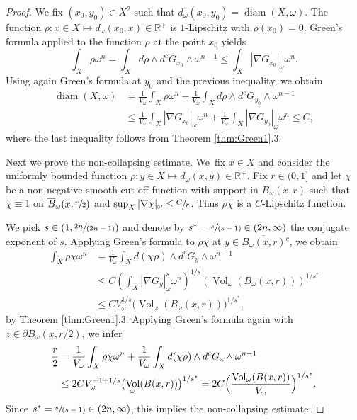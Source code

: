 \documentclass[JEP,XML,SOM,Unicode,published]{cedram}
\newcommand{\spfrac}[2]{\sfrac{#1}{(#2)}}
\DeclareMathOperator{\diam}{diam}
\DeclareMathOperator{\Vol}{Vol}
\theoremstyle{definition}
\begin{document}
\begin{proof}
We fix $(x_0,y_0)\in X^2$ such that $d_\omega(x_0,y_0)=\diam(X, \omega)$.
The function $\rho: x \in X \mapsto d_\omega(x_0, x) \in \mathbb{R}^+$ is $1$-Lipschitz
with $\rho(x_0)=0$. Green's formula applied to the function $\rho$ at the point $x_0$ yields
\[
\int_X \rho \omega^n =\int_X d \rho \wedge d^c G_{x_0} \wedge\omega^{n-1} \leq \int_X |\nabla G_{x_0}|_{\omega}\omega^n .
\]
Using again Green's formula at $y_0$ and the previous inequality, we obtain
\begin{align*}
\diam(X, \omega)
&= \frac{1}{V_\omega} \int_X \rho\omega^n - \frac{1}{V_\omega} \int_X d \rho \wedge d^c G_{y_0} \wedge\omega^{n-1}\\
&\leq  \frac{1}{V_\omega}\int_X |\nabla G_{x_0}|_{\omega}\omega^n
+\frac{1}{V_\omega}\int_X |\nabla G_{y_0}|_{\omega}\omega^n \leq C,
\end{align*}
where the last inequality follows from Theorem \ref{thm:Green1}.3.

Next we prove the non-collapsing estimate. We~fix $x \in X$ and consider the uniformly bounded function $\rho: y \in X \mapsto d_\omega(x, y) \in \mathbb{R}^+$.
Fix $r\in (0,1]$ and let $\chi$ be a non-negative smooth cut-off function with support in $B_\omega(x, r)$ such that
$\chi\equiv 1$ on $\overline{B}_\omega(x, \sfrac{r}{2}) $ and $\sup_X |\nabla \chi|_\omega \leq \sfrac{C}{r}$.
Thus $\rho \chi$ is a $C$-Lipschitz function.

We pick $s\in (1, \spfrac{2n}{2n-1})$ and denote by $s^*=\spfrac{s}{s-1} \in (2n, \infty)$ the conjugate exponent of $s$.
Applying Green's formula to $\rho \chi$ at $y\in \overline{B_{\omega}(x,r )}{}^c $, we obtain
\begin{align*}
\int_X \rho\chi \omega^n &= \frac{1}{V_\omega} \int_X d(\chi \rho) \wedge d^c G_y \wedge \omega^{n-1} \\
&\leq C
\left(\int_X |\nabla G_y|^s_\omega \omega^n\right)^{1/s} \left(\Vol_\omega(B_{\omega}(x,r)) \right)^{1/s^*}\\
&\leq CV_\omega^{1/s} \bigl(\Vol_\omega(B_{\omega}(x,r)) \bigr)^{1/s^*},
\end{align*}
by Theorem \ref{thm:Green1}.3.
Applying Green's formula again with $z\in \partial B_\omega(x, r/2)$, we infer
\begin{align*}
\frac{r}{2} &=\frac{1}{V_\omega} \int_X \rho\chi \omega^n
+ \frac{1}{V_\omega} \int_X d(\chi \rho) \wedge d^c G_z \wedge \omega^{n-1} \\
&\leq 2CV_\omega^{-1+1/s} \bigl(\Vol_\omega(B(x,r)) \bigr)^{1/s^*}= 2C\Bigl( \frac{\Vol_\omega(B(x,r)) }{V_\omega} \Bigr)^{1/s^*}.
\end{align*}
Since $s^*=\spfrac{s}{s-1}\in (2n, \infty)$, this implies the non-collapsing estimate.


\end{proof}
\end{document}
